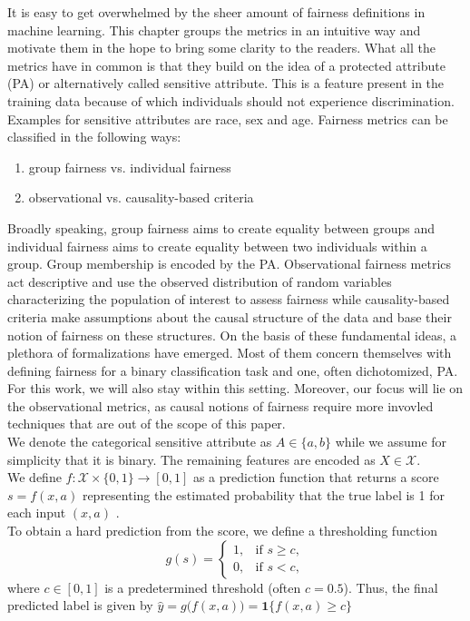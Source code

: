 It is easy to get overwhelmed by the sheer amount of fairness definitions in machine learning. This chapter groups the metrics in an intuitive way and motivate them in the hope to bring some clarity to the readers. What all the metrics have in common is that they build on the idea of a protected attribute (PA) or alternatively called sensitive attribute. This is a feature present in the training data because of which individuals should not experience discrimination. Examples for sensitive attributes are race, sex and age.
Fairness metrics can be classified in the following ways:
\begin{enumerate}
    \item group fairness vs. individual fairness
    \item observational vs. causality-based criteria
\end{enumerate}

Broadly speaking, group fairness aims to create equality between groups and individual fairness aims to create equality between two individuals within a group. Group membership is encoded by the PA. Observational fairness metrics act descriptive and use the observed distribution of random variables characterizing the population of interest to assess fairness while causality-based criteria make assumptions about the causal structure of the data and base their notion of fairness on these structures.
On the basis of these fundamental ideas, a plethora of formalizations have emerged. Most of them concern themselves with defining fairness for a binary classification task and one, often dichotomized, PA. For this work, we will also stay within this setting. Moreover, our focus will lie on the observational metrics, as causal notions of fairness require more invovled techniques that are out of the scope of this paper.\\
We denote the categorical sensitive attribute as $A \in \{a,b\}$ while we assume for simplicity that it is binary. The remaining features are encoded as $X \in \mathcal{X}$.\\
We define $f : \mathcal{X} \times \{0,1\} \to [0,1]$ as a prediction function that returns a score \(s = f(x, a)\) representing the estimated probability that the true label is 1 for each input $(x, a)$ .\\
To obtain a hard prediction from the score, we define a thresholding function
$$ g(s) = \begin{cases} 
1, & \text{if } s \ge c, \\
0, & \text{if } s < c,
\end{cases}$$
where \(c \in [0,1]\) is a predetermined threshold (often \(c = 0.5\)).
Thus, the final predicted label is given by $\hat{y} = g\bigl(f(x, a)\bigr) = \mathbf{1}\{f(x, a) \ge c\}$

